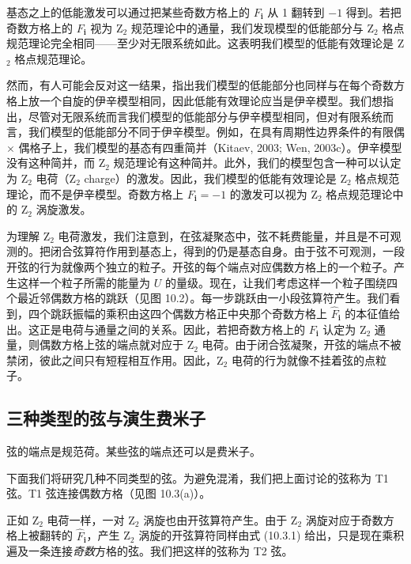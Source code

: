 基态之上的低能激发可以通过把某些奇数方格上的 $F_{\pmb{i}}$ 从 1 翻转到 $-1$ 得到。若把奇数方格上的 $F_{\pmb{i}}$ 视为 Z$_2$ 规范理论中的通量，我们发现模型的低能部分与 Z$_2$ 格点规范理论完全相同——至少对无限系统如此。这表明我们模型的低能有效理论是 Z$_2$ 格点规范理论。

然而，有人可能会反对这一结果，指出我们模型的低能部分也同样与在每个奇数方格上放一个自旋的伊辛模型相同，因此低能有效理论应当是伊辛模型。我们想指出，尽管对无限系统而言我们模型的低能部分与伊辛模型相同，但对有限系统而言，我们模型的低能部分不同于伊辛模型。例如，在具有周期性边界条件的有限偶 $\times$ 偶格子上，我们模型的基态有四重简并（Kitaev, 2003; Wen, 2003c）。伊辛模型没有这种简并，而 Z$_2$ 规范理论有这种简并。此外，我们的模型包含一种可以认定为 Z$_2$ 电荷（Z$_2$ charge）的激发。因此，我们模型的低能有效理论是 Z$_2$ 格点规范理论，而不是伊辛模型。奇数方格上 $F_{\pmb{i}}=-1$ 的激发可以视为 Z$_2$ 格点规范理论中的 Z$_2$ 涡旋激发。

为理解 Z$_2$ 电荷激发，我们注意到，在弦凝聚态中，弦不耗费能量，并且是不可观测的。把闭合弦算符作用到基态上，得到的仍是基态自身。由于弦不可观测，一段开弦的行为就像两个独立的粒子。开弦的每个端点对应偶数方格上的一个粒子。产生这样一个粒子所需的能量为 $U$ 的量级。现在，让我们考虑这样一个粒子围绕四个最近邻偶数方格的跳跃（见图 10.2）。每一步跳跃由一小段弦算符产生。我们看到，四个跳跃振幅的乘积由这四个偶数方格正中央那个奇数方格上 $\hat F_{\pmb{i}}$ 的本征值给出。这正是电荷与通量之间的关系。因此，若把奇数方格上的 $F_{\pmb{i}}$ 认定为 Z$_2$ 通量，则偶数方格上弦的端点就对应于 Z$_2$ 电荷。由于闭合弦凝聚，开弦的端点不被禁闭，彼此之间只有短程相互作用。因此，Z$_2$ 电荷的行为就像不挂着弦的点粒子。


\subsection{三种类型的弦与演生费米子}

\begin{keypoints}\item 弦的端点是规范荷。某些弦的端点还可以是费米子。\end{keypoints}

下面我们将研究几种不同类型的弦。为避免混淆，我们把上面讨论的弦称为 T1 弦。T1 弦连接偶数方格（见图 10.3(a)）。

正如 Z$_2$ 电荷一样，一对 Z$_2$ 涡旋也由开弦算符产生。由于 Z$_2$ 涡旋对应于奇数方格上被翻转的 $\hat F_{\pmb{i}}$，产生 Z$_2$ 涡旋的开弦算符同样由式 (10.3.1) 给出，只是现在乘积遍及一条连接\emph{奇数}方格的弦。我们把这样的弦称为 T2 弦。

